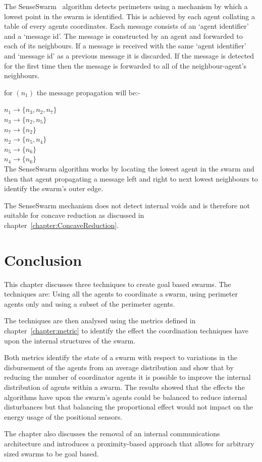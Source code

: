 The SenseSwarm~\cite{ZAPS:07, APZDAMC:09, AZDPS:11} algorithm detects perimeters using a mechanism by which a lowest point in the swarm is identified. This is achieved by each agent collating a table of every agents coordinates. Each message consists of an `agent identifier' and a `message id'. The message is constructed by an agent and forwarded to each of its neighbours. If a message is received with the same `agent identifier' and `message id' as a previous message it is discarded. If the message is detected for the first time then the message is forwarded to all of the neighbour-agent's neighbours.

for $(n_1)$ the message propagation will be:-

$n_1 \to \{n_3, n_2, n_7\}$ \\
$n_3 \to \{n_2, n_5\}$\\
$n_7 \to \{n_2\}$\\
$n_2 \to \{n_5, n_4\}$\\
$n_5 \to \{n_6\}$\\
$n_4 \to \{n_6\}$\\

The SenseSwarm algorithm works by locating the lowest agent in the swarm and then that agent propagating a message left and right to next lowest neighbours to identify the swarm's outer edge. 

The SenseSwarm mechanism does not detect internal voids and is therefore not suitable for concave reduction as discussed in chapter~\ref{chapter:ConcaveReduction}.

\section{Conclusion\label{methods:Conclusion}}

This chapter discusses three techniques to create goal based swarms. The techniques are: Using all the agents to coordinate a swarm, using perimeter agents only and using a subset of the perimeter agents. 

The techniques are then analysed using the metrics defined in chapter~\ref{chapter:metric} to identify the effect the coordination techniques have upon the internal structures of the swarm.

Both metrics identify the state of a swarm with respect to variations in the disbursement of the agents from an average distribution and show that by reducing the number of coordinator agents it is possible to improve the internal distribution of agents within a swarm. The results showed that the effects the algorithms have upon the swarm's agents could be balanced to reduce internal disturbances but that balancing the proportional effect would not impact on the energy usage of the positional sensors. 

The chapter also discusses the removal of an internal communications architecture and introduces a proximity-based approach that allows for arbitrary sized swarms to be goal based. 

